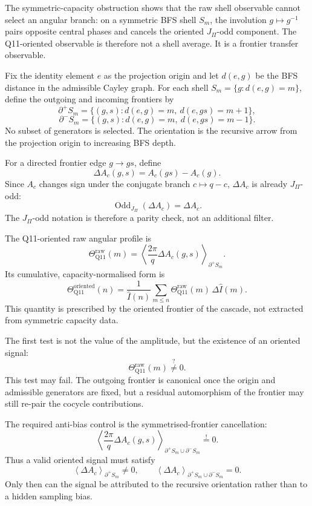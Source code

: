 \documentclass[11pt]{article}
\providecommand{\Ihat}{\widehat{I}}
\begin{document}
    The symmetric-capacity obstruction shows that the raw shell observable cannot
    select an angular branch: on a symmetric BFS shell $S_m$, the involution
    $g\mapsto g^{-1}$ pairs opposite central phases and cancels the oriented
    $J_\Pi$-odd component.
    The Q11-oriented observable is therefore not a shell average.
    It is a frontier transfer observable.

    Fix the identity element $e$ as the projection origin and let $d(e,g)$ be the
    BFS distance in the admissible Cayley graph.
    For each shell $S_m=\{g:d(e,g)=m\}$, define the outgoing and incoming frontiers by
    \[
      \partial^+S_m
      =
      \{(g,s): d(e,g)=m,\ d(e,gs)=m+1\},
    \]
    \[
      \partial^-S_m
      =
      \{(g,s): d(e,g)=m,\ d(e,gs)=m-1\}.
    \]
    No subset of generators is selected.
    The orientation is the recursive arrow from the projection origin to increasing
    BFS depth.

    For a directed frontier edge $g\to gs$, define
    \[
      \Delta A_c(g,s)=A_c(gs)-A_c(g).
    \]
    Since $A_c$ changes sign under the conjugate branch $c\mapsto q-c$,
    $\Delta A_c$ is already $J_\Pi$-odd:
    \[
      \operatorname{Odd}_{J_\Pi}(\Delta A_c)=\Delta A_c.
    \]
    The $J_\Pi$-odd notation is therefore a parity check, not an additional filter.

    The Q11-oriented raw angular profile is
    \[
      \Theta_{\mathrm{Q11}}^{\mathrm{raw}}(m)
      =
      \left\langle
        \frac{2\pi}{q}\Delta A_c(g,s)
      \right\rangle_{\partial^+S_m}.
    \]
    Its cumulative, capacity-normalised form is
    \[
      \Theta_{\mathrm{Q11}}^{\mathrm{oriented}}(n)
      =
      \frac{1}{\Ihat(n)}
      \sum_{m\le n}
      \Theta_{\mathrm{Q11}}^{\mathrm{raw}}(m)\,\Delta\Ihat(m).
    \]
    This quantity is prescribed by the oriented frontier of the cascade, not extracted
    from symmetric capacity data.

    The first test is not the value of the amplitude, but the existence of an oriented
    signal:
    \[
      \Theta_{\mathrm{Q11}}^{\mathrm{raw}}(m)\overset{?}{\neq}0.
    \]
    This test may fail.
    The outgoing frontier is canonical once the origin and admissible generators are
    fixed, but a residual automorphism of the frontier may still re-pair the cocycle
    contributions.

    The required anti-bias control is the symmetrised-frontier cancellation:
    \[
      \left\langle
        \frac{2\pi}{q}\Delta A_c(g,s)
      \right\rangle_{\partial^+S_m\cup\partial^-S_m}
      \overset{!}{=}0.
    \]
    Thus a valid oriented signal must satisfy
    \[
      \left\langle \Delta A_c\right\rangle_{\partial^+S_m}\neq0,
      \qquad
      \left\langle \Delta A_c\right\rangle_{\partial^+S_m\cup\partial^-S_m}=0.
    \]
    Only then can the signal be attributed to the recursive orientation rather than
    to a hidden sampling bias.
\end{document}
